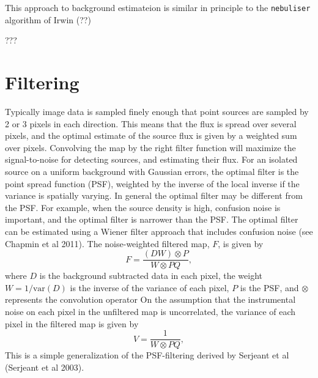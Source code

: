 \documentclass[useAMS,usenatbib]{mn2e}
\begin{document}
This approach to background estimateion is similar in principle to the
{\tt nebuliser} algorithm of Irwin (??) 

???


%

\section{Filtering}

Typically image data is sampled finely enough that point sources are
sampled by 2 or 3 pixels in each direction. This means that the flux
is spread over several pixels, and the optimal estimate of the source
flux is given by a weighted sum over pixels. Convolving the map by the
right filter function will maximize the signal-to-noise for detecting
sources, and estimating their flux.  For an isolated source on a
uniform background with Gaussian errors, the optimal filter is the
point spread function (PSF), weighted by the inverse of the local
inverse if the variance is spatially varying. In general the optimal
filter may be different from the PSF. For example, when the source
density is high, confusion noise is important, and the optimal filter
is narrower than the PSF. The optimal filter can be estimated using a
Wiener filter approach that includes confusion noise (see Chapmin et
al 2011). The noise-weighted filtered map, $F$, is given by
\begin{equation}
F = \frac{(DW)\otimes P}{W\otimes PQ} ,
\label{filt}
\end{equation}
where $D$ is the background subtracted data in each pixel, the weight
$W=1/\mathrm{var}(D)$ is the inverse of the variance of each pixel,
$P$ is the PSF, and $\otimes$ represents the convolution operator
On the assumption that the instrumental noise on each pixel in the unfiltered
map is uncorrelated, the variance of each pixel in the filtered map is
given by
\begin{equation}
V = \frac{1}{W\otimes PQ} ,
\label{fvar}
\end{equation}
This is a simple generalization  of the PSF-filtering derived by Serjeant
et al (Serjeant et al 2003).
\end{document}

